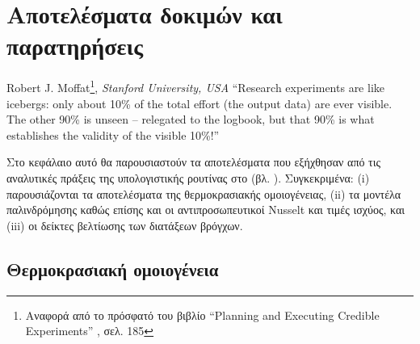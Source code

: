 \chapter{Αποτελέσματα δοκιμών και παρατηρήσεις}\label{ch:results}

\begin{chapquote}{Robert J. Moffat\footnote{Αναφορά από το πρόσφατό του βιβλίο “Planning and Executing Credible Experiments” \cite{2021_Moffat_BOOK}, σελ. 185}, \textit{Stanford University, USA}}
“Research experiments are like icebergs: only about 10\% of the total effort (the output data) are ever visible. The other 90\% is unseen – relegated to the logbook, but that 90\% is what establishes the validity of the visible 10\%!”
\end{chapquote}

\ifpdf
    \graphicspath{{Chapter5/Figs/Raster/}{Chapter5/Figs/PDF/}{Chapter5/Figs/}}
\else
    \graphicspath{{Chapter5/Figs/Vector/}{Chapter5/Figs/}}
\fi





\noindent Στο κεφάλαιο αυτό θα παρουσιαστούν τα αποτελέσματα που εξήχθησαν από τις αναλυτικές πράξεις της υπολογιστικής ρουτίνας στο \matlab (βλ. ). Συγκεκριμένα: (i) παρουσιάζονται τα αποτελέσματα της θερμοκρασιακής ομοιογένειας, (ii) τα μοντέλα παλινδρόμησης καθώς επίσης και οι αντιπροσωπευτικοί Nusselt και τιμές ισχύος, και (iii) οι δείκτες βελτίωσης των διατάξεων βρόγχων.

\section{Θερμοκρασιακή ομοιογένεια}

